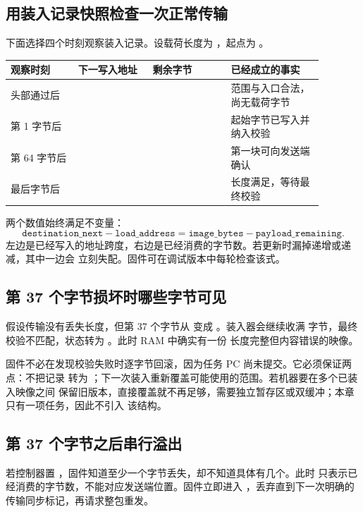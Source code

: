 \subsection{用装入记录快照检查一次正常传输}

下面选择四个时刻观察装入记录。设载荷长度为 ，起点为
。

\begin{longtable}{|L{0.19\linewidth}|L{0.21\linewidth}|L{0.22\linewidth}|L{0.26\linewidth}|}
\hline
{}
观察时刻 & 下一写入地址 & 剩余字节 & 已经成立的事实 \\ \hline
头部通过后 &  &  & 范围与入口合法，尚无载荷字节 \\ \hline
第 1 字节后 &  &  & 起始字节已写入并纳入校验 \\ \hline
第 64 字节后 &  &  & 第一块可向发送端确认 \\ \hline
最后字节后 &  &  & 长度满足，等待最终校验 \\ \hline
\end{longtable}

两个数值始终满足不变量：
\[
\texttt{destination\_next}-\texttt{load\_address}
=\texttt{image\_bytes}-\texttt{payload\_remaining}.
\]
左边是已经写入的地址跨度，右边是已经消费的字节数。若更新时漏掉递增或递减，其中一边会
立刻失配。固件可在调试版本中每轮检查该式。

\subsection{第 37 个字节损坏时哪些字节可见}

假设传输没有丢失长度，但第 37 个字节从  变成 。装入器会继续收满
 字节，最终校验不匹配，状态转为 。此时 RAM 中确实有一份
长度完整但内容错误的映像。

固件不必在发现校验失败时逐字节回滚，因为任务 PC 尚未提交。它必须保证两点：不把记录
转为 ；下一次装入重新覆盖可能使用的范围。若机器要在多个已装入映像之间
保留旧版本，直接覆盖就不再足够，需要独立暂存区或双缓冲；本章只有一项任务，因此不引入
该结构。

\subsection{第 37 个字节之后串行溢出}

若控制器置 ，固件知道至少一个字节丢失，却不知道具体有几个。此时
 只表示已经消费的字节数，不能对应发送端位置。固件立即进入
，丢弃直到下一次明确的传输同步标记，再请求整包重发。

